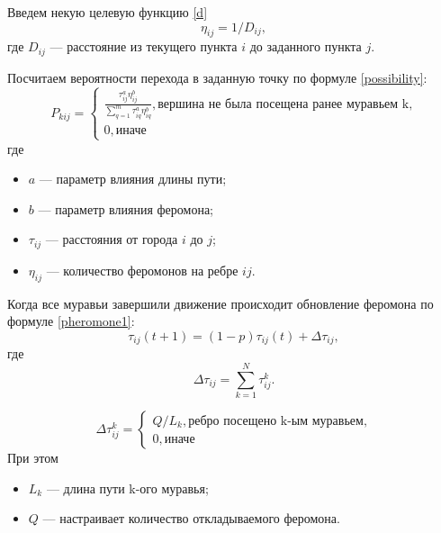 Введем некую целевую функцию \eqref{d}
\begin{equation}
	\label{d}
	\eta_{ij} = 1 / D_{ij},
\end{equation}
где $D_{ij}$ --- расстояние из текущего пункта $i$ до заданного пункта $j$.

Посчитаем вероятности перехода в заданную точку по формуле \eqref{possibility}:
\begin{equation}
	\label{possibility}
	P_{kij} = \begin{cases}
		\frac{\tau_{ij}^a\eta_{ij}^b}{\sum_{q=1}^m \tau^a_{iq}\eta^b_{iq}}, \textrm{вершина не была посещена ранее муравьем k,} \\
		0, \textrm{иначе}
	\end{cases}
\end{equation}
где 
\begin{itemize}
	\item $a$ --- параметр влияния длины пути;
	\item $b$ --- параметр влияния феромона;
	\item $\tau_{ij}$ --- расстояния от города $i$ до $j$;
	\item $\eta_{ij}$ --- количество феромонов на ребре $ij$.
\end{itemize}


Когда все муравьи завершили движение происходит обновление феромона по формуле \eqref{pheromone1}:
\begin{equation}
	\label{pheromone1}
	\tau_{ij}(t+1) = (1-p)\tau_{ij}(t) + \Delta \tau_{ij},
\end{equation}
где
\begin{equation}
	\label{pheromone11}
	\Delta \tau_{ij} = \sum_{k=1}^N \tau^k_{ij}.
\end{equation}

\begin{equation}
	\label{pheromone2}
	\Delta\tau^k_{ij} = \begin{cases}
		Q/L_{k}, \textrm{ребро посещено k-ым муравьем,} \\
		0, \textrm{иначе}
	\end{cases}
\end{equation}
При этом
\begin{itemize}
	\item $L_{k}$ --- длина пути k-ого муравья;
	\item $Q$ --- настраивает количество откладываемого феромона.
\end{itemize}

